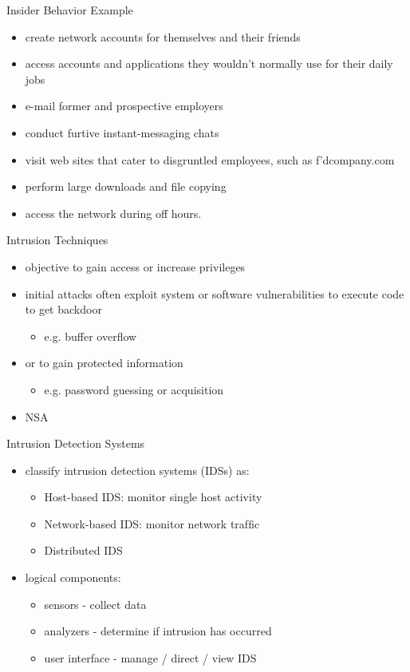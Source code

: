 \documentclass{beamer}
\begin{document}
\begin{frame}{Insider Behavior Example}
  \begin{itemize}
  \item create network accounts for themselves and their 
    friends
  \item access accounts and applications they wouldn't 
    normally use for their daily jobs
  \item e-mail former and prospective employers
  \item conduct furtive instant-messaging chats
  \item visit web sites that cater to disgruntled 
    employees, such as f'dcompany.com
  \item perform large downloads and ﬁle copying
  \item access the network during off hours.
  \end{itemize}
\end{frame}

\begin{frame}{Intrusion Techniques}
  \begin{itemize}
  \item objective to gain access or increase privileges
  \item initial attacks often exploit system or software 
    vulnerabilities to execute code to get backdoor
      \begin{itemize}
      \item e.g. buffer overflow 
      \end{itemize}
  \item or to gain protected information 
      \begin{itemize}
      \item e.g. password guessing or acquisition
      \end{itemize}
    \item NSA
  \end{itemize}
\end{frame}


\begin{frame}{Intrusion Detection Systems}
  \begin{itemize}
    \item classify intrusion detection systems (IDSs) as:
      \begin{itemize}
      \item Host-based IDS: monitor single host activity
      \item Network-based IDS: monitor network trafﬁc
      \item Distributed IDS
      \end{itemize}
    \item logical components:
      \begin{itemize}
      \item sensors - collect data
      \item analyzers - determine if intrusion has occurred
      \item user interface - manage / direct / view IDS
      \end{itemize}
  \end{itemize}
\end{frame}
\end{document}
